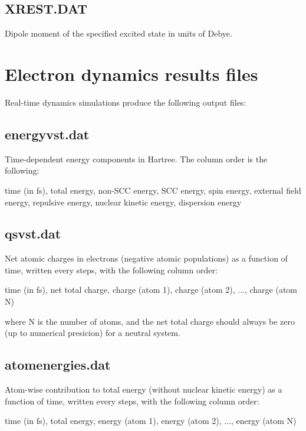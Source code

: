 \subsection{XREST.DAT}

Dipole moment of the specified excited state in units of Debye.

\section{Electron dynamics results files}
\label{sec:tddftb_rt}

Real-time dynamics simulations produce the following output files:

\subsection{energyvst.dat}

Time-dependent energy components in Hartree. The column order is the
following:

time (in fs), total energy, non-SCC energy, SCC energy, spin energy,
external field energy, repulsive energy, nuclear kinetic energy,
dispersion energy

\subsection{qsvst.dat}

Net atomic charges in electrons (negative atomic populations) as a
function of time, written every  steps, with the
following column order:

time (in fs), net total charge, charge (atom 1), charge (atom 2), ...,
charge (atom N)

where N is the number of atoms, and the net total charge should always
be zero (up to numerical presicion) for a neutral system.

\subsection{atomenergies.dat}

Atom-wise contribution to total energy (without nuclear kinetic energy)
as a function of time, written every  steps, with the
following column order:

time (in fs), total energy, energy (atom 1), energy (atom 2), ...,
energy (atom N)

